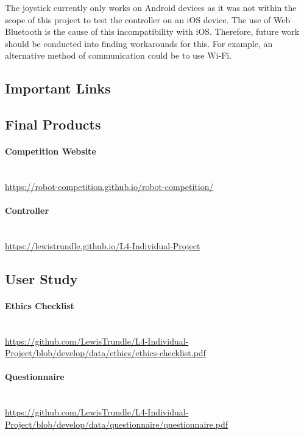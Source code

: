 \documentclass{l4proj}
\begin{document}
The joystick currently only works on Android devices as it was not within the scope of this project to test the controller on an iOS device. The use of Web Bluetooth is the cause of this incompatibility with iOS. Therefore, future work should be conducted into finding workarounds for this. For example, an alternative method of communication could be to use Wi-Fi.



%
% 

\begin{appendices}

\chapter{Important Links}
\section{Final Products}
\subsubsection{Competition Website} \hfill \\
\url{https://robot-competition.github.io/robot-competition/}
\\
\subsubsection{Controller} \hfill \\
\url{https://lewistrundle.github.io/L4-Individual-Project}

\section{User Study}
\subsubsection{Ethics Checklist} \hfill \\
\url{https://github.com/LewisTrundle/L4-Individual-Project/blob/develop/data/ethics/ethics-checklist.pdf}
\\
\subsubsection{Questionnaire} \hfill \\
\url{https://github.com/LewisTrundle/L4-Individual-Project/blob/develop/data/questionnaire/questionnaire.pdf}
\\

\end{appendices}
\end{document}
